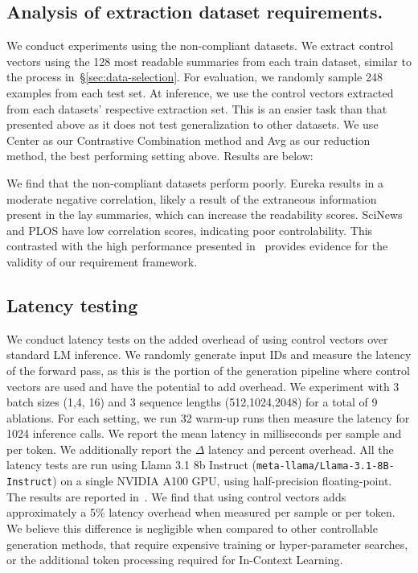 \subsection{Analysis of extraction dataset requirements.}\label{sec:other-datasets-exp}
We conduct experiments using the non-compliant datasets. We extract control vectors using the 128 most readable summaries from each train dataset, similar to the process in~\S\ref{sec:data-selection}. For evaluation, we randomly sample 248 examples from each test set. At inference, we use the control vectors extracted from each datasets' respective extraction set. This is an easier task than that presented above as it does not test generalization to other datasets. We use Center as our Contrastive Combination method and Avg as our reduction method, the best performing setting above. Results are below:


We find that the non-compliant datasets perform poorly. Eureka results in a moderate negative correlation, likely a result of the extraneous information present in the lay summaries, which can increase the readability scores. SciNews and PLOS have low correlation scores, indicating poor controlability. This contrasted with the high performance presented in~ provides evidence for the validity of our requirement framework.


\subsection{Latency testing}\label{appendix:latency-testing}

We conduct latency tests on the added overhead of using control vectors over standard LM inference. We randomly generate input IDs and measure the latency of the forward pass, as this is the portion of the generation pipeline where control vectors are used and have the potential to add overhead. We experiment with 3 batch sizes (1,4, 16) and 3 sequence lengths (512,1024,2048) for a total of 9 ablations. For each setting, we run 32 warm-up runs then measure the latency for 1024 inference calls. We report the mean latency in milliseconds per sample and per token. We additionally report the $\Delta$ latency and percent overhead. All the latency tests are run using Llama 3.1 8b Instruct (\texttt{meta-llama/Llama-3.1-8B-Instruct}) on a single NVIDIA A100 GPU, using half-precision floating-point. The results are reported in~. We find that using control vectors adds approximately a 5\% latency overhead when measured per sample or per token. We believe this difference is negligible when compared to other controllable generation methods, that require expensive training or hyper-parameter searches, or the additional token processing required for In-Context Learning. 